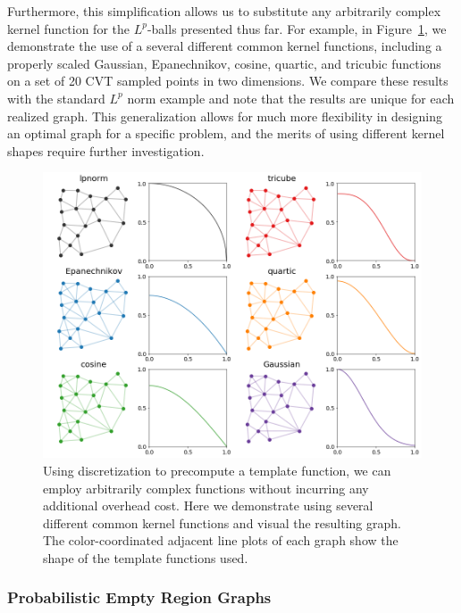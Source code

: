 Furthermore, this simplification allows us to substitute any arbitrarily complex kernel function for the $L^p$-balls presented thus far.
%
For example, in Figure~\ref{fig:discrete_beta}, we demonstrate the use of a several different common kernel functions, including a properly scaled Gaussian, Epanechnikov, cosine, quartic, and tricubic functions on a set of 20 CVT sampled points in two dimensions.
%
We compare these results with the standard $L^p$ norm example and note that the results are unique for each realized graph.
%
This generalization allows for much more flexibility in designing an optimal graph for a specific problem, and the merits of using different kernel shapes require further investigation.

\begin{figure}[htbp]
    \includegraphics[width=\linewidth]{figs/chap7/beta_shapes.png}
    \caption[Empty region graphs derived using kernel functions]{Using discretization to precompute a template function, we can employ arbitrarily complex functions without incurring any additional overhead cost.
    Here we demonstrate using several different common kernel functions and visual the resulting graph.
    The color-coordinated adjacent line plots of each graph show the shape of the template functions used.}
    \label{fig:discrete_beta}
\end{figure}

\subsubsection{Probabilistic Empty Region Graphs}

